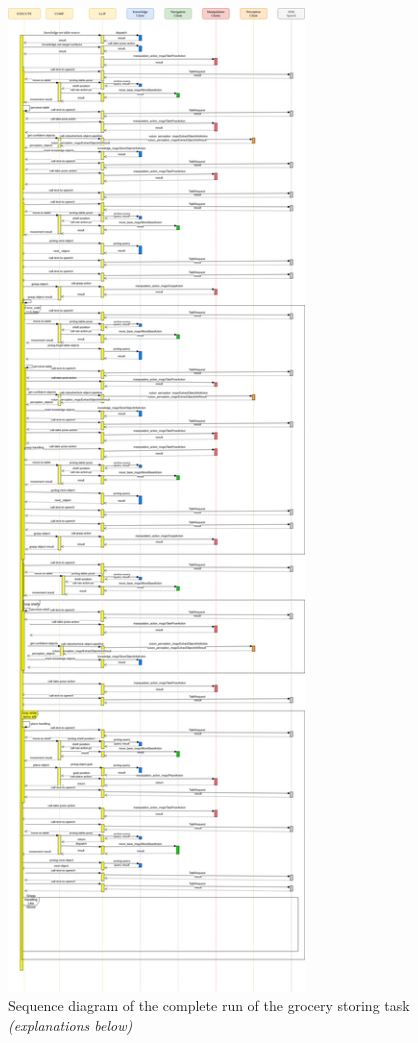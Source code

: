 \documentclass[main.tex]{subfiles}
\begin{document}
		\begin{figure}	
			\centering
			\includegraphics[width=0.7\textwidth]{pictures/diagramms/grocery-sequence .png}
			\caption{Sequence diagram of the complete run of the grocery storing task \textit{(explanations below)}}
			\label{fig:grocery-sequence}
		\end{figure}
	
\end{document}
